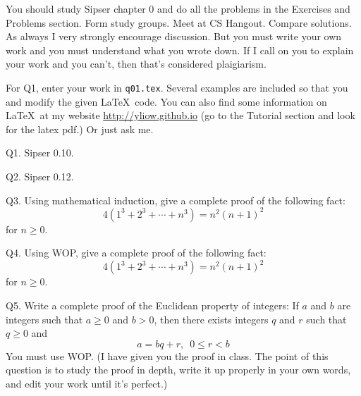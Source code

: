 



\renewcommand\AUTHOR{John Doe}
\renewcommand\EMAIL{jdoe@cougars.ccis.edu}
\renewcommand\TITLE{Assignment 2}


\topmatter

You should study Sipser chapter 0 and do all the problems in the Exercises
and Problems section.
Form study groups. Meet at CS Hangout. Compare solutions.
As always I very strongly encourage discussion.
But you must write your own work and you must understand what you wrote
down.
If I call on you to explain your work and you can't, then that's considered
plaigiarism.

For Q1, enter your work in \verb!q01.tex!.
Several examples are included so that you and modify the given \LaTeX\ code.
You can also find some information on \LaTeX\ at my website
\url{http://yliow.github.io} (go to the Tutorial section and look for
the latex pdf.) Or just ask me.

\newpage


\newpage
Q1. Sipser 0.10. 

\SOLUTION



\newpage
Q2. Sipser 0.12.

\SOLUTION



\newpage
Q3.
Using mathematical induction, give a complete proof of the following fact:
\[
  4(1^3 + 2^3 + \cdots + n^3) = n^2(n+1)^2
\]
for $n \geq 0$.

\SOLUTION



\newpage
Q4.
Using WOP, give a complete proof of the following fact:
\[
  4(1^3 + 2^3 + \cdots + n^3) = n^2(n+1)^2
\]
for $n \geq 0$.


\SOLUTION



\newpage
Q5. Write a complete proof of the Euclidean property of integers:
If $a$ and $b$ are integers such that $a \geq 0$ and $b > 0$,
then there exists integers $q$ and $r$ such that $q \geq 0$ and
\[
a = bq + r, \,\,\, 0 \leq r < b
\]
You must use WOP.
(I have given you the proof in class.
The point of this question is to study the proof in depth, write it up
properly in your own words, and edit your work until it's perfect.) 

